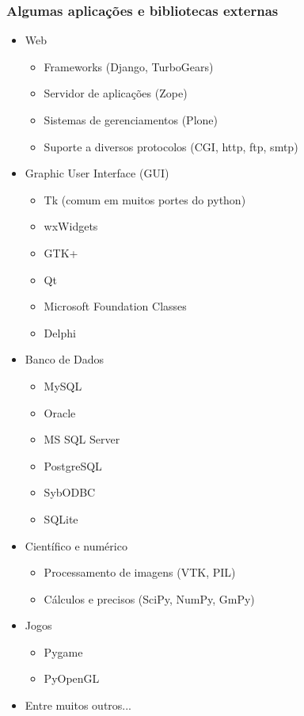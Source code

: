 \documentclass{beamer}
\begin{document}
\begin{frame}
\frametitle{Algumas aplicações e bibliotecas externas}

\begin{multicols}{2}{
  \begin{itemize}
    \item \scriptsize Web
    \begin{itemize}
      \item \scriptsize Frameworks (Django, TurboGears)
      \item Servidor de aplicações (Zope)
      \item Sistemas de gerenciamentos (Plone)
      \item Suporte a diversos protocolos (CGI, http, ftp, smtp)
    \end{itemize}
    \item Graphic User Interface (GUI)
    \begin{itemize}
      \item \scriptsize Tk (comum em muitos portes do python)
      \item wxWidgets
      \item GTK+
      \item Qt
      \item Microsoft Foundation Classes
      \item Delphi
    \end{itemize}
    \item Banco de Dados
    \begin{itemize}
      \item \scriptsize MySQL
      \item Oracle
      \item MS SQL Server
      \item PostgreSQL
      \item SybODBC
      \item SQLite
    \end{itemize}
    \item Científico e numérico
    \begin{itemize}
      \item \scriptsize Processamento de imagens (VTK, PIL)
      \item Cálculos e precisos (SciPy, NumPy, GmPy)
    \end{itemize}
    \item Jogos
    \begin{itemize}
      \item \scriptsize Pygame
      \item PyOpenGL
    \end{itemize}
    \item Entre muitos outros...
  \end{itemize}
}
\end{multicols}
\end{frame}
\end{document}
